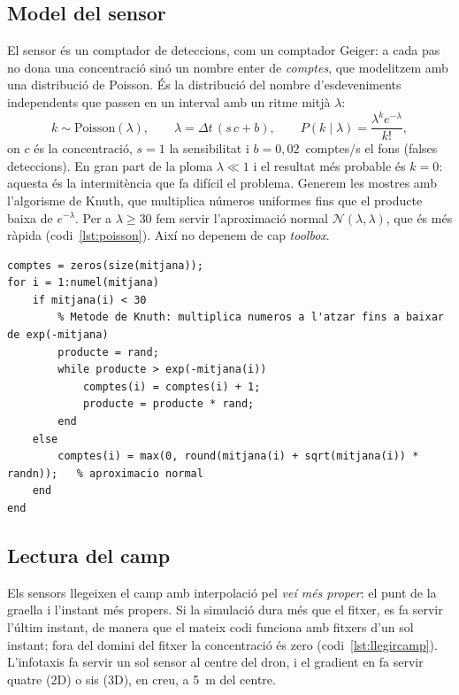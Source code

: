 \documentclass[11pt,a4paper]{article}
\begin{document}
\subsection{Model del sensor}

El sensor és un comptador de deteccions, com un comptador Geiger: a cada pas no dona una concentració sinó un nombre enter de \emph{comptes}, que modelitzem amb una distribució de Poisson. És la distribució del nombre d'esdeveniments independents que passen en un interval amb un ritme mitjà $\lambda$:
\begin{equation}
k \sim \text{Poisson}(\lambda), \qquad \lambda = \Delta t\,(s\,c + b), \qquad P(k \mid \lambda) = \frac{\lambda^k e^{-\lambda}}{k!},
\end{equation}
on $c$ és la concentració, $s = 1$ la sensibilitat i $b = 0{,}02$~comptes/s el fons (falses deteccions). En gran part de la ploma $\lambda \ll 1$ i el resultat més probable és $k = 0$: aquesta és la intermitència que fa difícil el problema. Generem les mostres amb l'algorisme de Knuth, que multiplica números uniformes fins que el producte baixa de $e^{-\lambda}$. Per a $\lambda \geq 30$ fem servir l'aproximació normal $\mathcal{N}(\lambda, \lambda)$, que és més ràpida (codi~\ref{lst:poisson}). Així no depenem de cap \emph{toolbox}.

\begin{lstlisting}[caption={Generació de comptes de Poisson (\texttt{Dron.poissonAleatori}).}, label=lst:poisson]
comptes = zeros(size(mitjana));
for i = 1:numel(mitjana)
    if mitjana(i) < 30
        % Metode de Knuth: multiplica numeros a l'atzar fins a baixar de exp(-mitjana)
        producte = rand;
        while producte > exp(-mitjana(i))
            comptes(i) = comptes(i) + 1;
            producte = producte * rand;
        end
    else
        comptes(i) = max(0, round(mitjana(i) + sqrt(mitjana(i)) * randn));   % aproximacio normal
    end
end
\end{lstlisting}

\subsection{Lectura del camp}

Els sensors llegeixen el camp amb interpolació pel \emph{veí més proper}: el punt de la graella i l'instant més propers. Si la simulació dura més que el fitxer, es fa servir l'últim instant, de manera que el mateix codi funciona amb fitxers d'un sol instant; fora del domini del fitxer la concentració és zero (codi~\ref{lst:llegircamp}). L'infotaxis fa servir un sol sensor al centre del dron, i el gradient en fa servir quatre (2D) o sis (3D), en creu, a 5~m del centre.
\end{document}
